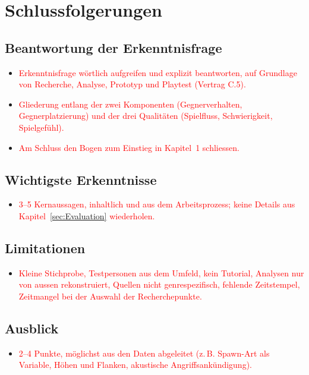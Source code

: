 \documentclass[../Main.tex]{subfiles}
\begin{document}
\section{Schlussfolgerungen} \label{sec:Schlussfolgerungen}

\subsection{Beantwortung der Erkenntnisfrage}

\begin{itemize}[leftmargin=1.5cm]
    \item \textcolor{red}{Erkenntnisfrage wörtlich aufgreifen und explizit beantworten, auf Grundlage von Recherche, Analyse, Prototyp und Playtest (Vertrag C.5).}
    \item \textcolor{red}{Gliederung entlang der zwei Komponenten (Gegnerverhalten, Gegnerplatzierung) und der drei Qualitäten (Spielfluss, Schwierigkeit, Spielgefühl).}
    \item \textcolor{red}{Am Schluss den Bogen zum Einstieg in Kapitel~1 schliessen.}
\end{itemize}

\subsection{Wichtigste Erkenntnisse}

\begin{itemize}[leftmargin=1.5cm]
    \item \textcolor{red}{3--5 Kernaussagen, inhaltlich und aus dem Arbeitsprozess; keine Details aus Kapitel~\ref{sec:Evaluation} wiederholen.}
\end{itemize}

\subsection{Limitationen}

\begin{itemize}[leftmargin=1.5cm]
    \item \textcolor{red}{Kleine Stichprobe, Testpersonen aus dem Umfeld, kein Tutorial, Analysen nur von aussen rekonstruiert, Quellen nicht genrespezifisch, fehlende Zeitstempel, Zeitmangel bei der Auswahl der Recherchepunkte.}
\end{itemize}

\subsection{Ausblick}

\begin{itemize}[leftmargin=1.5cm]
    \item \textcolor{red}{2--4 Punkte, möglichst aus den Daten abgeleitet (z.\,B. Spawn-Art als Variable, Höhen und Flanken, akustische Angriffsankündigung).}
\end{itemize}
\end{document}
